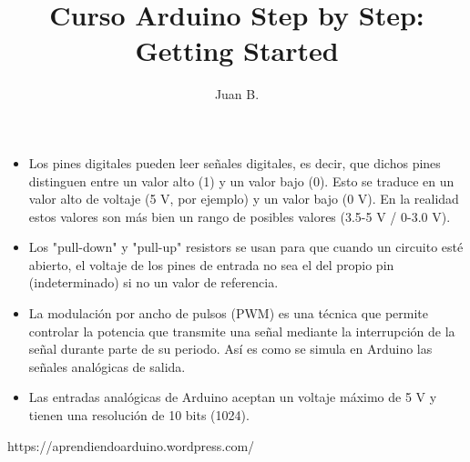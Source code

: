 \documentclass[12pt]{article}
\title{Curso Arduino Step by Step: Getting Started}
\author{Juan B.}
\begin{document}
    

    \begin{itemize}
        \item Los pines digitales pueden leer señales digitales, es decir, que dichos pines distinguen entre un valor alto (1) y un valor bajo (0). Esto se traduce en un valor alto de voltaje (5 V, por ejemplo) y un valor bajo (0 V). En la realidad estos valores son más bien un rango de posibles valores (3.5-5 V / 0-3.0 V).
        \item Los "pull-down" y "pull-up" resistors se usan para que cuando un circuito esté abierto, el voltaje de los pines de entrada no sea el del propio pin (indeterminado) si no un valor de referencia.
        \item La modulación por ancho de pulsos (PWM) es una técnica que permite controlar la potencia que transmite una señal mediante la interrupción de la señal durante parte de su periodo. Así es como se simula en Arduino las señales analógicas de salida.
        \item Las entradas analógicas de Arduino aceptan un voltaje máximo de 5 V y tienen una resolución de 10 bits (1024).

    \end{itemize}

    https://aprendiendoarduino.wordpress.com/
\end{document}
